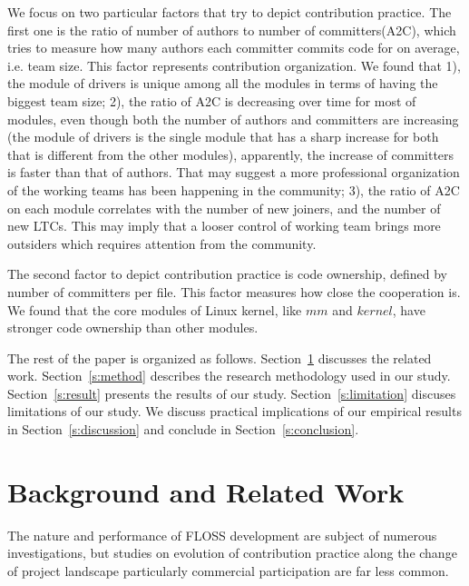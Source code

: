 \documentclass{sig-alternate-05-2015}
\begin{document}
We focus on two particular factors that try to depict contribution practice.
The first one is the ratio of number of authors to number of committers(A2C), which tries to measure %
how many authors each committer commits code for on average, i.e. team size. This factor represents contribution organization. We found that
1), the module of drivers is unique among all the modules in terms of having the biggest team size; %
2), the ratio of A2C is decreasing over time for most of modules, even though both the number of authors and committers are increasing (the module of drivers is the single module that has a sharp increase for both that is different from the other modules), apparently, the increase of committers is faster than that of authors.
That may suggest a more professional organization of the working teams has been happening in the community;
3), the ratio of A2C on each module correlates with the number of new joiners, and the number of new LTCs. This may imply that a looser control of working team brings more outsiders which requires attention from the community.

The second factor to depict contribution practice is code ownership, defined by number of committers per file. This factor measures how close the cooperation is. We found that the core modules of Linux kernel, like $mm$ and $kernel$, have stronger code ownership than other modules.

The rest of the paper is organized as follows. Section~\ref{s:related}
discusses the related work. Section~\ref{s:method} describes the research
methodology used in our study. Section~\ref{s:result} presents the results
of our study. Section~\ref{s:limitation} discuses limitations of our study.
We discuss practical implications of our empirical results in Section~\ref{s:discussion}
and conclude in Section~\ref{s:conclusion}.

\section{Background and Related Work}\label{s:related}

The nature and performance of FLOSS development are subject of
numerous investigations, but studies on evolution of contribution practice
along the change of project landscape particularly commercial participation
 are far less common.
\end{document}
